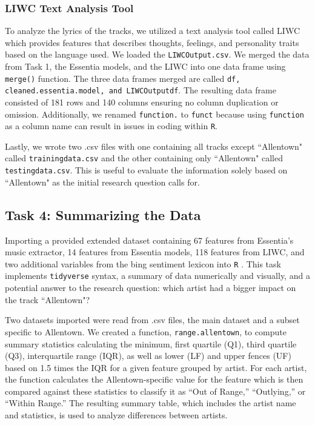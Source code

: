 \documentclass{article}\usepackage[]{graphicx}\usepackage[]{xcolor}
\begin{document}
\begin{multicols}{2}
\subsubsection{LIWC Text Analysis Tool}
To analyze the lyrics of the tracks, we utilized a text analysis tool called LIWC which provides features that describes thoughts, feelings, and personality traits based on the language used. We loaded the \texttt{LIWCOutput.csv}. We merged the data from Task 1, the Essentia models, and the LIWC into one data frame using \texttt{merge()} function. The three data frames merged are called \texttt{df, cleaned.essentia.model, and LIWCOutputdf}. The resulting data frame consisted of 181 rows and 140 columns ensuring no column duplication or omission. Additionally, we renamed \texttt{function.} to \texttt{funct} because using \texttt{function} as a column name can result in issues in coding within \texttt{R}. 

Lastly, we wrote two .csv files with one containing all tracks except ``Allentown" called \texttt{trainingdata.csv} and the other containing only ``Allentown" called \texttt{testingdata.csv}. This is useful to evaluate the information solely based on ``Allentown" as the initial research question calls for. 

\subsection{Task 4: Summarizing the Data}

Importing a provided extended dataset containing 67 features from Essentia’s music extractor, 14 features from Essentia models, 118 features from LIWC, and two additional variables from the bing sentiment lexicon\citep{HuLiu2004} into \texttt{R} . This task implements \texttt{tidyverse}\citep{tidyverse} syntax, a summary of data numerically and visually, and a potential answer to the research question: which artist had a bigger impact on the track ``Allentown"\citep{Ross}?

Two datasets imported were read from .csv files, the main dataset and a subset specific to Allentown. We created a function, \texttt{range.allentown}, to compute summary statistics calculating the minimum, first quartile (Q1), third quartile (Q3), interquartile range (IQR), as well as lower (LF) and upper fences (UF) based on 1.5 times the IQR for a given feature grouped by artist. For each artist, the function calculates the Allentown-specific value for the feature which is then compared against these statistics to classify it as “Out of Range,” “Outlying,” or “Within Range.” The resulting summary table, which includes the artist name and statistics, is used to analyze differences between artists. 


\end{multicols}
\end{document}

